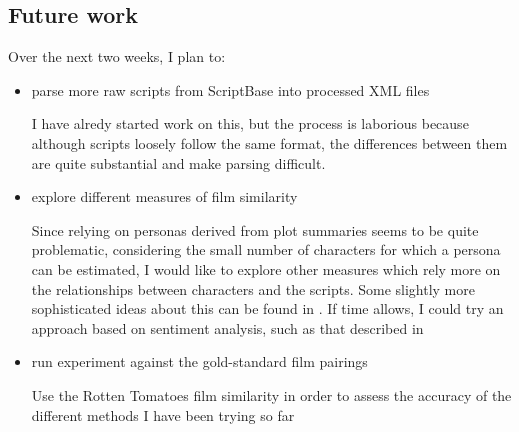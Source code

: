 \documentclass[bsc,frontabs,singlespacing,parskip]{infthesis} %
\begin{document}
\subsection{Future work}
Over the next two weeks, I plan to:
\begin{itemize}

	\item parse more raw scripts from ScriptBase into processed XML files

	I have alredy started work on this, but the process is laborious because although scripts loosely follow the same format, the differences between them are quite substantial and make parsing difficult.

	\item explore different measures of film similarity
	
	Since relying on personas derived from plot summaries seems to be quite problematic, considering the small number of characters for which a persona can be estimated, I would like to explore other measures which rely more on the relationships between characters and the scripts. Some slightly more sophisticated ideas about this can be found in \cite{Gorinski}. If time allows, I could try an approach based on sentiment analysis, such as that described in \cite{Nalisnick2013}
	
	\item run experiment against the gold-standard film pairings
	
	Use the Rotten Tomatoes film similarity in order to assess the accuracy of the different methods I have been trying so far
\end{itemize}



\end{document}

